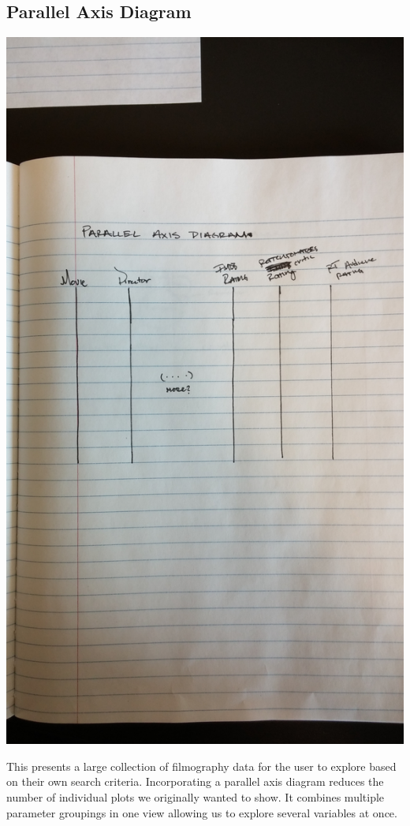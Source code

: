 \documentclass[12pt]{article}
\begin{document}
\subsection{Parallel Axis Diagram}
\begin{center}
 \includegraphics[angle=-90, scale=0.05]{parallel.jpg}
\end{center}
 This presents a large collection of filmography data for the user to explore based on their own search criteria.  Incorporating a parallel axis diagram reduces the number of individual plots we originally wanted to show.  It combines multiple parameter groupings  in one view allowing us to explore several variables at once. 
 
\end{document}
